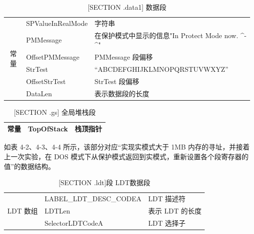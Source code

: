 \begin{table}[H]
\begin{center}
\caption{[SECTION .data1] 数据段}
\begin{tabular}{|c|l|l|}
\hline
\multirow{6}{*}{常量} & SPValueInRealMode & 字符串                                                                     \\ \cline{2-3} 
                    & PMMessage         & 在保护模式中显示的信息"In Protect Mode now. \textasciicircum{}-\textasciicircum{}" \\ \cline{2-3} 
                    & OffsetPMMessage   & PMMessage 段偏移                                                           \\ \cline{2-3} 
                    & StrTest           & “ABCDEFGHIJKLMNOPQRSTUVWXYZ”                                            \\ \cline{2-3} 
                    & OffsetStrTest     & StrTest 段偏移                                                             \\ \cline{2-3} 
                    & DataLen           & 表示数据段的长度                                                                \\ \hline
\end{tabular}
\end{center}
\end{table}

\begin{table}[H]
\begin{center}
\caption{[SECTION .gs] 全局堆栈段}
\begin{tabular}{|c|l|l|}
\hline
常量 & TopOfStack & 栈顶指针 \\ \hline
\end{tabular}
\end{center}
\end{table}

如表 4-2、4-3、4-4 所示，该部分对应“实现实模式大于 1MB 内存的寻址，并接着上一次实验，在 DOS 模式下从保护模式返回到实模式，重新设置各个段寄存器的值”的数据结构。

\begin{table}[H]
\begin{center}
\caption{[SECTION .ldt]段 LDT数据段}
\begin{tabular}{|c|l|l|}
\hline
\multirow{3}{*}{LDT 数组} & LABEL\_LDT\_DESC\_CODEA & LDT 描述符    \\ \cline{2-3} 
                        & LDTLen                  & 表示 LDT 的长度 \\ \cline{2-3} 
                        & SelectorLDTCodeA        & LDT 选择子    \\ \hline
\end{tabular}
\end{center}
\end{table}

